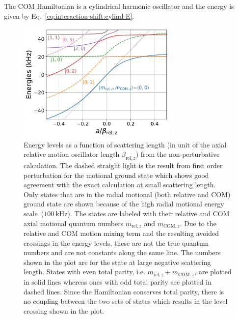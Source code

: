 The COM Hamiltonian is a cylindrical harmonic oscillator and the energy is given by
Eq.~\ref{eq:interaction-shift:cylind-E}.

\begin{figure}
  \centering
  \includegraphics[width=0.7\textwidth]{figures/interaction_shift_energies.pdf}
  \caption[Result of interaction shift calculation.]{
    Energy levels as a function of scattering length
    (in unit of the axial relative motion oscillator length
    $\beta_{\mathrm{rel},z}$) from the non-perturbative calculation.
    The dashed straight light is the result from first order perturbation
    for the motional ground state which shows good agreement with the exact calculation
    at small scattering length.
    Only states that are in the radial motional (both relative and COM) ground state
    are shown because of the high radial motional energy scale~($100~\mathrm{kHz}$).
    The states are labeled with their relative and COM axial motional quantum numbers
    $m_{\mathrm{rel},z}$ and $m_{\mathrm{COM},z}$.
    Due to the relative and COM motion mixing term and the resulting avoided crossings
    in the energy levels, these are not the true quantum numbers
    and are not constants along the same line.
    The numbers shown in the plot are for the state at large negative scattering length.
    States with even total parity, i.e. $m_{\mathrm{rel},z} + m_{\mathrm{COM},z}$, are plotted in solid lines
    whereas ones with odd total parity are plotted in dashed lines.
    Since the Hamiltonian conserves total parity,
    there is no coupling between the two sets of states
    which results in the level crossing shown in the plot.
    \label{fig:interaction-shift:energies}}
\end{figure}

